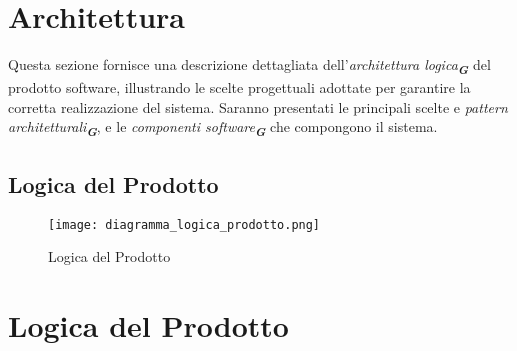 
\section{Architettura}
\label{sec:architettura}

Questa sezione fornisce una descrizione dettagliata dell'\emph{architettura logica}\textsubscript{\textbf{\textit{G}}} del prodotto software, illustrando le scelte progettuali adottate per garantire la corretta realizzazione del sistema. Saranno presentati le principali scelte e \emph{pattern architetturali}\textsubscript{\textbf{\textit{G}}}, e le \emph{componenti software}\textsubscript{\textbf{\textit{G}}} che compongono il sistema.

\subsection{Logica del Prodotto}
\label{sec:logica_prodotto}

\begin{figure}[h]
    \centering
    \texttt{[image: diagramma\_logica\_prodotto.png]}
    \caption{Logica del Prodotto}
\end{figure}

\section{Logica del Prodotto}

